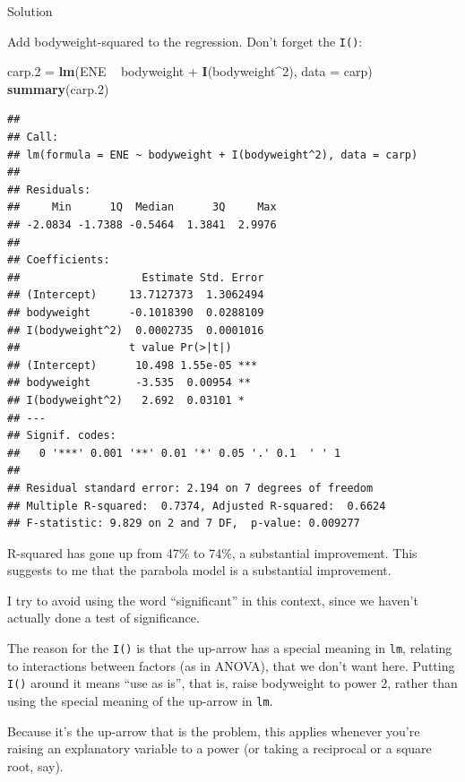 \documentclass[]{tufte-book}
\newenvironment{Shaded}{}{}
\newcommand{\DataTypeTok}[1]{\textcolor[rgb]{0.56,0.13,0.00}{#1}}
\newcommand{\DecValTok}[1]{\textcolor[rgb]{0.25,0.63,0.44}{#1}}
\newcommand{\FloatTok}[1]{\textcolor[rgb]{0.25,0.63,0.44}{#1}}
\newcommand{\KeywordTok}[1]{\textcolor[rgb]{0.00,0.44,0.13}{\textbf{#1}}}
\newcommand{\NormalTok}[1]{#1}
\newcommand{\OperatorTok}[1]{\textcolor[rgb]{0.40,0.40,0.40}{#1}}
\newcommand{\StringTok}[1]{\textcolor[rgb]{0.25,0.44,0.63}{#1}}
\theoremstyle{definition}
\theoremstyle{definition}
\theoremstyle{definition}
\theoremstyle{remark}
\begin{document}
Solution

Add bodyweight-squared to the regression. Don't forget the \texttt{I()}:

\begin{Shaded}
\begin{Highlighting}[]
\NormalTok{carp}\FloatTok{.2}\NormalTok{ =}\StringTok{ }\KeywordTok{lm}\NormalTok{(ENE }\OperatorTok{~}\StringTok{ }\NormalTok{bodyweight }\OperatorTok{+}\StringTok{ }\KeywordTok{I}\NormalTok{(bodyweight}\OperatorTok{^}\DecValTok{2}\NormalTok{), }
    \DataTypeTok{data =}\NormalTok{ carp)}
\KeywordTok{summary}\NormalTok{(carp}\FloatTok{.2}\NormalTok{)}
\end{Highlighting}
\end{Shaded}

\begin{verbatim}
## 
## Call:
## lm(formula = ENE ~ bodyweight + I(bodyweight^2), data = carp)
## 
## Residuals:
##     Min      1Q  Median      3Q     Max 
## -2.0834 -1.7388 -0.5464  1.3841  2.9976 
## 
## Coefficients:
##                   Estimate Std. Error
## (Intercept)     13.7127373  1.3062494
## bodyweight      -0.1018390  0.0288109
## I(bodyweight^2)  0.0002735  0.0001016
##                 t value Pr(>|t|)    
## (Intercept)      10.498 1.55e-05 ***
## bodyweight       -3.535  0.00954 ** 
## I(bodyweight^2)   2.692  0.03101 *  
## ---
## Signif. codes:  
##   0 '***' 0.001 '**' 0.01 '*' 0.05 '.' 0.1  ' ' 1
## 
## Residual standard error: 2.194 on 7 degrees of freedom
## Multiple R-squared:  0.7374, Adjusted R-squared:  0.6624 
## F-statistic: 9.829 on 2 and 7 DF,  p-value: 0.009277
\end{verbatim}

R-squared has gone up from 47\% to 74\%, a substantial improvement. This
suggests to me that the parabola model is a substantial improvement.

I try to avoid using the word ``significant'' in this context, since we
haven't actually done a test of significance.

The reason for the \texttt{I()} is that the up-arrow has a special
meaning in \texttt{lm}, relating to interactions between factors (as in
ANOVA), that we don't want here. Putting \texttt{I()} around it means
``use as is'', that is, raise bodyweight to power 2, rather than using
the special meaning of the up-arrow in \texttt{lm}.

Because it's the up-arrow that is the problem, this applies whenever
you're raising an explanatory variable to a power (or taking a
reciprocal or a square root, say).
\end{document}
